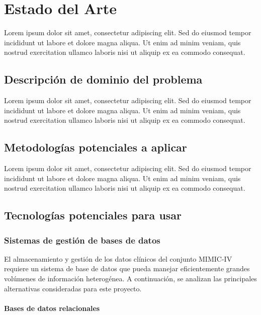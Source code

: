 \chapter{Estado del Arte}

Lorem ipsum dolor sit amet, consectetur adipiscing elit. Sed do eiusmod tempor incididunt ut labore et dolore magna aliqua. Ut enim ad minim veniam, quis nostrud exercitation ullamco laboris nisi ut aliquip ex ea commodo consequat.

\section{Descripción de dominio del problema}

Lorem ipsum dolor sit amet, consectetur adipiscing elit. Sed do eiusmod tempor incididunt ut labore et dolore magna aliqua. Ut enim ad minim veniam, quis nostrud exercitation ullamco laboris nisi ut aliquip ex ea commodo consequat.

\section{Metodologías potenciales a aplicar}

Lorem ipsum dolor sit amet, consectetur adipiscing elit. Sed do eiusmod tempor incididunt ut labore et dolore magna aliqua. Ut enim ad minim veniam, quis nostrud exercitation ullamco laboris nisi ut aliquip ex ea commodo consequat.

\section{Tecnologías potenciales para usar}

\subsection{Sistemas de gestión de bases de datos}

El almacenamiento y gestión de los datos clínicos del conjunto MIMIC-IV requiere un sistema de base de datos que pueda manejar eficientemente grandes volúmenes de información heterogénea. A continuación, se analizan las principales alternativas consideradas para este proyecto.

\subsubsection{Bases de datos relacionales}

